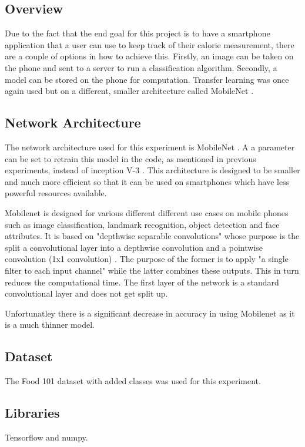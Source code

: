 \subsection*{Overview}
Due to the fact that the end goal for this project is to have a smartphone
application that a user can use to keep track of their calorie measurement,
there are a couple of options in how to achieve this. Firstly, an image can be
taken on the phone and sent to a server to run a classification algorithm.
Secondly, a model can be stored on the phone for computation. Transfer learning was once again used but on a different, smaller architecture called MobileNet \textcite{mobilenet}.

\subsection*{Network Architecture}
The network architecture used for this experiment is MobileNet \textcite{mobilenet}.
A a parameter can be set to retrain this model in the code, as mentioned in previous experiments, instead of inception V-3 \textcite{retrainInception}. 
This architecture is designed to be smaller and much more efficient so that
it can be used on smartphones which have less powerful resources available.

Mobilenet is designed for various different different use cases on mobile phones such as image classification, landmark recognition, object detection and face attributes.
It is based on "depthwise separable convolutions" whose purpose is the split a convolutional layer into a depthwise convolution and a pointwise convolution (1x1 convolution) \textcite{mobilenet}.
The purpose of the former is to apply "a single filter to each input channel" \textcite{mobilenet} while the latter combines these outputs.
This in turn reduces the computational time.
The first layer of the network is a standard convolutional layer and does not get split up.

Unfortunatley there is a significant decrease in accuracy in using Mobilenet as it is a much thinner model.

\subsection*{Dataset}
The Food 101 dataset \textcite{food101} with added classes was used for this experiment.

\subsection*{Libraries}
Tensorflow and numpy.

